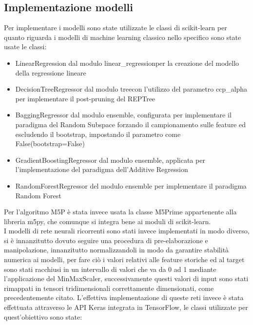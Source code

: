 \subsection{Implementazione modelli}
Per implementare i modelli sono state utilizzate le classi di scikit-learn per quanto riguarda i modelli di machine learning classico nello specifico sono state usate le classi:
\begin{itemize}
	\item LinearRegression dal modulo linear\_regressionper la creazione del modello della regressione lineare
	\item DecisionTreeRegressor dal modulo treecon l'utilizzo del parametro ccp\_alpha per implementare il post-pruning del REPTree 
	\item BaggingRegressor dal modulo ensemble, configurata per implementare il paradigma del Random Subspace forzando il campionamento sulle feature ed escludendo il bootstrap, impostando il parametro come False(bootstrap=False)
	\item GradientBoostingRegressor dal modulo ensemble, applicata per l'implementazione del paradigma dell'Additive Regression
	\item RandomForestRegressor del modulo ensemble per implementare il paradigma Random Forest
\end{itemize}
Per l'algoritmo M5P è stata invece usata la classe M5Prime appartenente alla libreria m5py, che comunque si integra bene ai moduli di scikit-learn.\\
I modelli di rete neurali ricorrenti sono stati invece implementati in modo diverso, si è innanzitutto dovuto seguire una procedura di pre-elaborazione e manipolazione, innanzitutto normalizzandoli in modo da garantire stabilità numerica ai modelli, per fare ciò i valori relativi alle feature storiche ed al target sono stati racchiusi in un intervallo di valori che va da 0 ad 1 mediante l'applicazione del MinMaxScaler, successivamente questi valori di input sono stati rimappati in tensori tridimensionali correttamente dimensionati, come precedentemente citato. L'effettiva implementazione di queste reti invece è stata effettuata attraverso le API Keras integrata in TensorFlow, le classi utilizzate per quest'obiettivo sono state:
